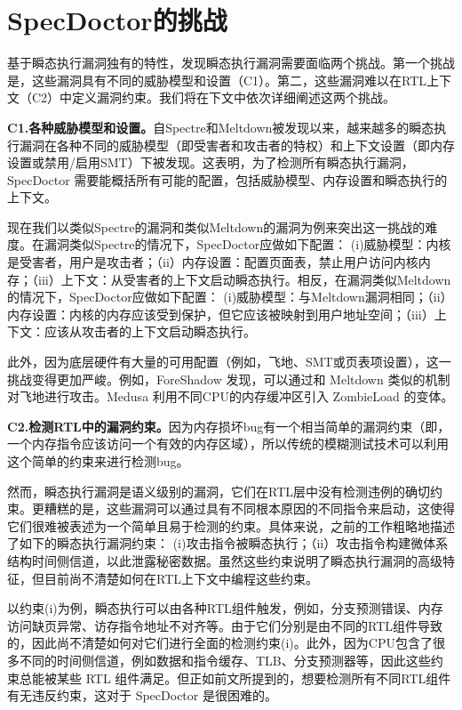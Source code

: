 \section{SpecDoctor的挑战}

基于瞬态执行漏洞独有的特性，发现瞬态执行漏洞需要面临两个挑战。第一个挑战是，这些漏洞具有不同的威胁模型和设置（C1）。第二，这些漏洞难以在RTL上下文（C2）中定义漏洞约束。我们将在下文中依次详细阐述这两个挑战。\par

\textbf{C1.各种威胁模型和设置。}自Spectre和Meltdown被发现以来，越来越多的瞬态执行漏洞在各种不同的威胁模型（即受害者和攻击者的特权）和上下文设置（即内存设置或禁用/启用SMT）下被发现。这表明，为了检测所有瞬态执行漏洞，SpecDoctor 需要能概括所有可能的配置，包括威胁模型、内存设置和瞬态执行的上下文。\par

现在我们以类似Spectre的漏洞和类似Meltdown的漏洞为例来突出这一挑战的难度。在漏洞类似Spectre的情况下，SpecDoctor应做如下配置： (i)威胁模型：内核是受害者，用户是攻击者；（ii）内存设置：配置页面表，禁止用户访问内核内存；（iii）上下文：从受害者的上下文启动瞬态执行。相反，在漏洞类似Meltdown的情况下，SpecDoctor应做如下配置： (i)威胁模型：与Meltdown漏洞相同；（ii）内存设置：内核的内存应该受到保护，但它应该被映射到用户地址空间；（iii）上下文：应该从攻击者的上下文启动瞬态执行。\par

此外，因为底层硬件有大量的可用配置（例如，飞地、SMT或页表项设置），这一挑战变得更加严峻。例如，ForeShadow 发现，可以通过和 Meltdown 类似的机制对飞地进行攻击。Medusa 利用不同CPU的内存缓冲区引入 ZombieLoad 的变体。\par

\textbf{C2.检测RTL中的漏洞约束。}因为内存损坏bug有一个相当简单的漏洞约束（即，一个内存指令应该访问一个有效的内存区域），所以传统的模糊测试技术可以利用这个简单的约束来进行检测bug。\par

然而，瞬态执行漏洞是语义级别的漏洞，它们在RTL层中没有检测违例的确切约束。更糟糕的是，这些漏洞可以通过具有不同根本原因的不同指令来启动，这使得它们很难被表述为一个简单且易于检测的约束。具体来说，之前的工作粗略地描述了如下的瞬态执行漏洞约束： (i)攻击指令被瞬态执行；（ii）攻击指令构建微体系结构时间侧信道，以此泄露秘密数据。虽然这些约束说明了瞬态执行漏洞的高级特征，但目前尚不清楚如何在RTL上下文中编程这些约束。\par

以约束(i)为例，瞬态执行可以由各种RTL组件触发，例如，分支预测错误、内存访问缺页异常、访存指令地址不对齐等。由于它们分别是由不同的RTL组件导致的，因此尚不清楚如何对它们进行全面的检测约束(i)。此外，因为CPU包含了很多不同的时间侧信道，例如数据和指令缓存、TLB、分支预测器等，因此这些约束总能被某些 RTL 组件满足。但正如前文所提到的，想要检测所有不同RTL组件有无违反约束，这对于 SpecDoctor 是很困难的。\par

